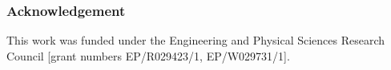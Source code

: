 \documentclass[]{beamer}
\begin{document}
\begin{frame}
\frametitle{Acknowledgement}
This work was funded under
the Engineering and Physical
Sciences Research Council [grant numbers EP/R029423/1, EP/W029731/1].
\end{frame}
\end{document}
